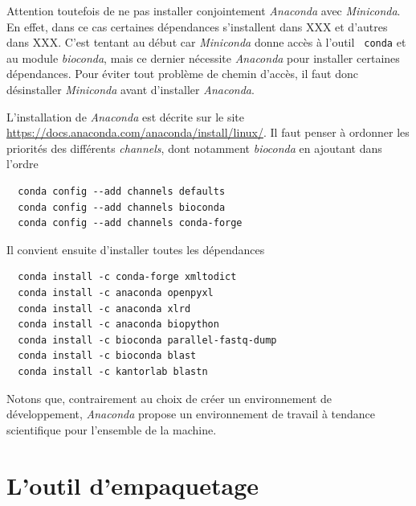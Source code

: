 \documentclass[twoside,a4paper,11pt,frenchb,openany]{report}
\begin{document}
Attention toutefois de ne pas installer conjointement \textit{Anaconda} avec \textit{Miniconda}. En effet, dans ce cas certaines dépendances s'installent dans XXX et d'autres dans XXX. C'est tentant au début car \textit{Miniconda} donne accès à l'outil \texttt{  conda} et au module \textit{bioconda}, mais ce dernier nécessite \textit{Anaconda} pour installer certaines dépendances. Pour éviter tout problème de chemin d'accès, il faut donc désinstaller \textit{Miniconda} avant d'installer \textit{Anaconda}. 

L'installation de \textit{Anaconda} est décrite sur le site \url{https://docs.anaconda.com/anaconda/install/linux/}. Il faut penser à ordonner les priorités des différents \textit{channels}, dont notamment \textit{bioconda} en ajoutant dans l'ordre

\begin{verbatim}
  conda config --add channels defaults
  conda config --add channels bioconda
  conda config --add channels conda-forge
\end{verbatim}

 Il convient ensuite d'installer toutes les dépendances 
\begin{verbatim}  conda install -c conda-forge xmltodict
  conda install -c anaconda openpyxl
  conda install -c anaconda xlrd
  conda install -c anaconda biopython
  conda install -c bioconda parallel-fastq-dump
  conda install -c bioconda blast
  conda install -c kantorlab blastn\end{verbatim}

Notons que, contrairement au choix de créer un environnement de développement, \textit{Anaconda} propose un environnement de travail à tendance scientifique pour l'ensemble de la machine.




\section{L'outil d'empaquetage}
	
\end{document}
